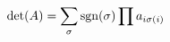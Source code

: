 \documentclass[preview]{standalone}
\begin{document}
\begin{align*}
\special{dvisvgm:raw <g id='unique000'>}\det(A) = \sum_{\sigma} \text{sgn}(\sigma) \prod a_{i\sigma(i)}\special{dvisvgm:raw </g>}
\end{align*}
\end{document}
